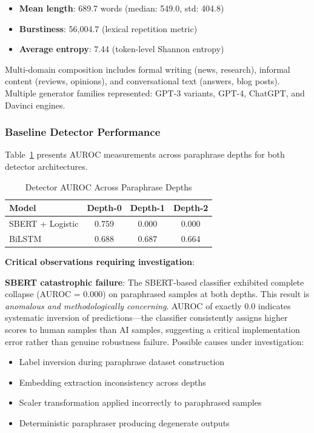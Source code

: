 \documentclass[conference]{IEEEtran}
\begin{document}
\begin{itemize}
    \item \textbf{Mean length}: 689.7 words (median: 549.0, std: 404.8)
    \item \textbf{Burstiness}: 56,004.7 (lexical repetition metric)
    \item \textbf{Average entropy}: 7.44 (token-level Shannon entropy)
\end{itemize}

Multi-domain composition includes formal writing (news, research), informal content (reviews, opinions), and conversational text (answers, blog posts). Multiple generator families represented: GPT-3 variants, GPT-4, ChatGPT, and Davinci engines.

\subsubsection{Baseline Detector Performance}

Table~\ref{tab:auroc_results} presents AUROC measurements across paraphrase depths for both detector architectures.

\begin{table}[h]
\centering
\caption{Detector AUROC Across Paraphrase Depths}
\label{tab:auroc_results}
\begin{tabular}{lccc}
\toprule
\textbf{Model} & \textbf{Depth-0} & \textbf{Depth-1} & \textbf{Depth-2} \\
\midrule
SBERT + Logistic & 0.759 & 0.000 & 0.000 \\
BiLSTM & 0.688 & 0.687 & 0.664 \\
\bottomrule
\end{tabular}
\end{table}

\textbf{Critical observations requiring investigation}:

\textbf{SBERT catastrophic failure}: The SBERT-based classifier exhibited complete collapse (AUROC = 0.000) on paraphrased samples at both depths. This result is \emph{anomalous and methodologically concerning}. AUROC of exactly 0.0 indicates systematic inversion of predictions—the classifier consistently assigns higher scores to human samples than AI samples, suggesting a critical implementation error rather than genuine robustness failure. Possible causes under investigation:

\begin{itemize}
    \item Label inversion during paraphrase dataset construction
    \item Embedding extraction inconsistency across depths
    \item Scaler transformation applied incorrectly to paraphrased samples
    \item Deterministic paraphraser producing degenerate outputs
\end{itemize}
\end{document}
